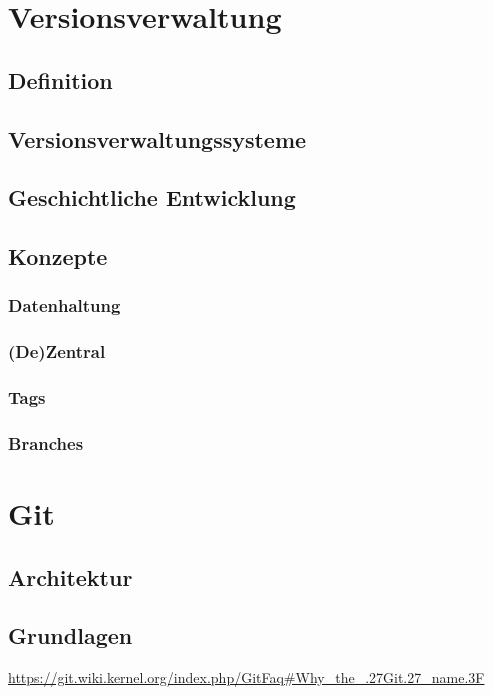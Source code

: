 \chapter{Versionsverwaltung}
\label{cha:Versionsverwaltung}
\section{Definition}
\label{sec:Definition}
\section{Versionsverwaltungssysteme}
\label{sec:systems}
\section{Geschichtliche Entwicklung}
\label{sec:GeschichtlicheEntwicklung}
\section{Konzepte}
\label{sec:Konzepte}
\subsection{Datenhaltung}
\label{sec:Datenhaltung}
\subsection{(De)Zentral}
\label{sec:dezentral}
\subsection{Tags}
\label{sec:Tags}
\subsection{Branches}
\label{sec:Branches}

\chapter{Git}
\label{cha:Git}
\section{Architektur}
\label{sec:Architektur}
\section{Grundlagen}
\label{sec:Grundlagen}
\url{https://git.wiki.kernel.org/index.php/GitFaq#Why_the_.27Git.27_name.3F}
